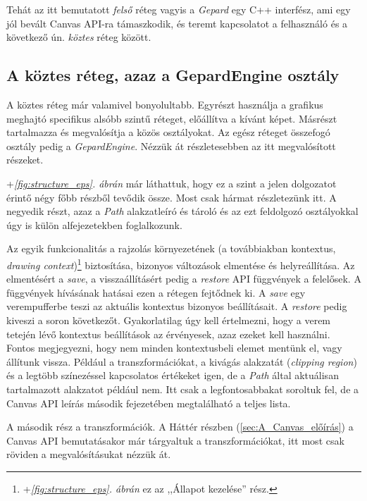 \documentclass[12pt]{report}
\theoremstyle{definition}
\newcommand{\inenglish}[1]{\textsl{#1}}
\newcommand{\func}[1]{{\textsl{#1}}}
\begin{document}
Tehát az itt bemutatott \emph{felső} réteg vagyis a \func{Gepard} egy C++
interfész, ami egy jól bevált Canvas API-ra támaszkodik, és teremt kapcsolatot
a felhasználó és a következő ún. \emph{köztes} réteg között.

    \subsection*{A köztes réteg, azaz a GepardEngine osztály}

A köztes réteg már valamivel bonyolultabb. Egyrészt használja a grafikus
meghajtó specifikus alsóbb szintű réteget, előállítva a kívánt képet. Másrészt
tartalmazza és megvalósítja a közös osztályokat. Az egész réteget összefogó
osztály pedig a \func{GepardEngine}. Nézzük át részletesebben az itt
megvalósított részeket.

\Az+\emph{\ref{fig:structure_eps}. ábrán} már láthattuk, hogy ez a szint a jelen
dolgozatot érintő négy főbb részből tevődik össze. Most csak hármat
részletezünk itt. A negyedik részt, azaz a \emph{Path} alakzatleíró és tároló
és az ezt feldolgozó osztályokkal úgy is külön alfejezetekben foglalkozunk.

Az egyik funkcionalitás a rajzolás környezetének (a továbbiakban kontextus,
\inenglish{drawing context})\footnote{\Az+\emph{\ref{fig:structure_eps}. ábrán} ez az
,,Állapot kezelése'' rész.} biztosítása, bizonyos változások elmentése és
helyreállítása. Az elmentésért a \func{save}, a visszaállításért pedig a
\func{restore} API függvények a felelősek. A függvények hívásának hatásai ezen
a rétegen fejtődnek ki. A \func{save} egy verempufferbe teszi az aktuális
kontextus bizonyos beállításait. A \func{restore} pedig kiveszi a soron
következőt. Gyakorlatilag úgy kell értelmezni, hogy a verem tetején lévő
kontextus beállítások az érvényesek, azaz ezeket kell használni. Fontos
megjegyezni, hogy nem minden kontextusbeli elemet mentünk el, vagy állítunk
vissza. Például a transzformációkat, a kivágás alakzatát (\inenglish{clipping
region}) és a legtöbb színezéssel kapcsolatos értékeket igen, de a \emph{Path}
által aktuálisan tartalmazott alakzatot például nem. Itt csak a
legfontosabbakat soroltuk fel, de a Canvas API leírás \cite{Cabanier:14:HCC}
második fejezetében megtalálható a teljes lista.

A második rész a transzformációk. A Háttér részben (\ref{sec:A_Canvas_előírás}) a
Canvas API bemutatásakor már tárgyaltuk a transzformációkat, itt most csak
röviden a megvalósításukat nézzük át.
\end{document}
